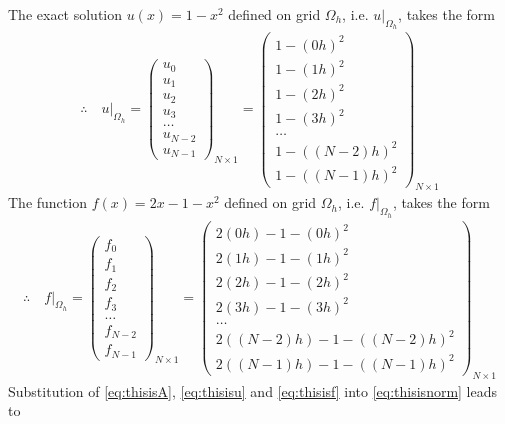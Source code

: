 \documentclass[12pt]{article}
\begin{document}
The exact solution $u(x) = 1-x^2$ defined on grid $\Omega_{h}$, i.e. $u\big|_{\Omega_{h}}$, takes the form
\begin{align}
	\label{eq:thisisu}
	\therefore\quad\boxed{
	u\big|_{\Omega_{h}} 
	=
	\begin{pmatrix}
		u_{0} \\u_{1}\\u_{2}\\u_{3}\\ \dots \\ u_{N-2}\\u_{N-1}
	\end{pmatrix}_{N\times 1}
	=
	\begin{pmatrix}
		1-(0h)^2 \\ 1-(1h)^2 \\ 1-(2h)^2 \\ 1-(3h)^2\\ \dots \\ 1-((N-2)h)^2 \\ 1-((N-1)h)^2
	\end{pmatrix}_{N\times 1}
	}
\end{align}
The function $f(x) = 2x-1-x^2$ defined on grid $\Omega_{h}$, i.e. $f\big|_{\Omega_{h}}$, takes the form
\begin{align}
	\label{eq:thisisf}
	\therefore\quad\boxed{
	f\big|_{\Omega_{h}} 
	=
	\begin{pmatrix}
		f_{0} \\f_{1}\\f_{2}\\f_{3}\\ \dots \\ f_{N-2}\\f_{N-1}
	\end{pmatrix}_{N\times 1}
	=
	\begin{pmatrix}
		2(0h)-1-(0h)^2         \\ 
		2(1h)-1-(1h)^2         \\ 
		2(2h)-1-(2h)^2         \\ 
		2(3h)-1-(3h)^2         \\
		\dots                  \\ 
		2((N-2)h)-1-((N-2)h)^2 \\ 
		2((N-1)h)-1-((N-1)h)^2
	\end{pmatrix}_{N\times 1}
	}
\end{align}
Substitution of \eqref{eq:thisisA}, \eqref{eq:thisisu} and \eqref{eq:thisisf}
into \eqref{eq:thisisnorm} leads to
\end{document}
